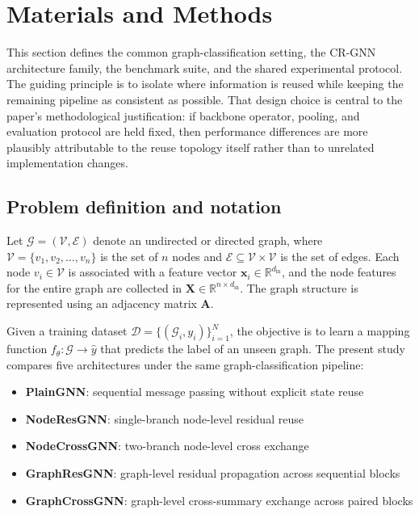 \section{Materials and Methods}
\label{sec:methods}

This section defines the common graph-classification setting, the CR-GNN architecture family, the benchmark suite, and the shared experimental protocol. The guiding principle is to isolate where information is reused while keeping the remaining pipeline as consistent as possible. That design choice is central to the paper's methodological justification: if backbone operator, pooling, and evaluation protocol are held fixed, then performance differences are more plausibly attributable to the reuse topology itself rather than to unrelated implementation changes.

\subsection{Problem definition and notation}

Let $\mathcal{G} = (\mathcal{V}, \mathcal{E})$ denote an undirected or directed graph, where $\mathcal{V} = \{v_1, v_2, \ldots, v_n\}$ is the set of $n$ nodes and $\mathcal{E} \subseteq \mathcal{V} \times \mathcal{V}$ is the set of edges. Each node $v_i \in \mathcal{V}$ is associated with a feature vector $\mathbf{x}_i \in \mathbb{R}^{d_{\text{in}}}$, and the node features for the entire graph are collected in $\mathbf{X} \in \mathbb{R}^{n \times d_{\text{in}}}$. The graph structure is represented using an adjacency matrix $\mathbf{A}$.

Given a training dataset $\mathcal{D} = \{(\mathcal{G}_i, y_i)\}_{i=1}^{N}$, the objective is to learn a mapping function $f_\theta: \mathcal{G} \rightarrow \hat{y}$ that predicts the label of an unseen graph. The present study compares five architectures under the same graph-classification pipeline:
\begin{itemize}
    \item \textbf{PlainGNN}: sequential message passing without explicit state reuse
    \item \textbf{NodeResGNN}: single-branch node-level residual reuse
    \item \textbf{NodeCrossGNN}: two-branch node-level cross exchange
    \item \textbf{GraphResGNN}: graph-level residual propagation across sequential blocks
    \item \textbf{GraphCrossGNN}: graph-level cross-summary exchange across paired blocks
\end{itemize}

